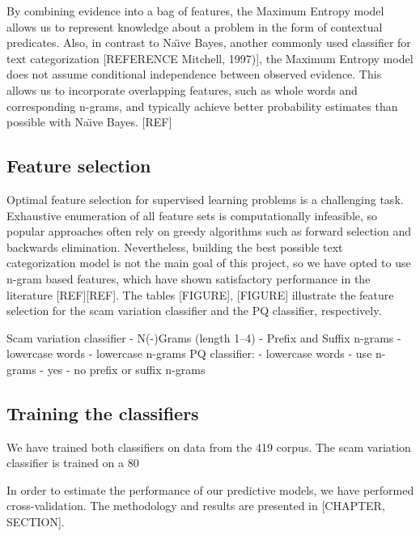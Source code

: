 By combining evidence into a bag of features, the Maximum Entropy model allows us to represent knowledge about a problem in the form of contextual predicates. Also, in contrast to Na\"{\i}ve Bayes, another commonly used classifier for text categorization [REFERENCE Mitchell, 1997)], the Maximum Entropy model does not assume conditional independence between observed evidence. This allows us to incorporate overlapping features, such as whole words and corresponding n-grams, and typically achieve better probability estimates than possible with Na\"{\i}ve Bayes. [REF]

\subsection{Feature selection}
Optimal feature selection for supervised learning problems is a challenging task. Exhaustive enumeration of all feature sets is computationally infeasible, so popular approaches often rely on greedy algorithms such as forward selection and backwards elimination. Nevertheless, building the best possible text categorization model is not the main goal of this project, so we have opted to use n-gram based features, which have shown satisfactory performance in the literature [REF][REF]. The tables [FIGURE], [FIGURE] illustrate the feature selection for the scam variation classifier and the PQ classifier, respectively.

	Scam variation classifier
	- N(-)Grams (length 1--4)
	- Prefix and Suffix n-grams
	- lowercase words
	- lowercase n-grams
	PQ classifier:
	- lowercase words
	- use n-grams - yes
	- no prefix or suffix n-grams

\subsection{Training the classifiers}

We have trained both classifiers on data from the 419 corpus.  The scam variation classifier is trained on a 80%

In order to estimate the performance of our predictive models, we have performed cross-validation. The methodology and results are presented in [CHAPTER, SECTION].